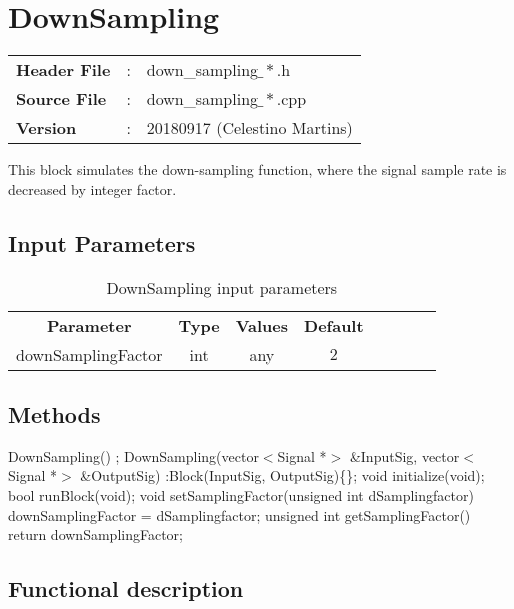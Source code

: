 \clearpage

\section{DownSampling}

\begin{tcolorbox}	
	\begin{tabular}{p{2.75cm} p{0.2cm} p{10.5cm}} 	
		\textbf{Header File}   &:& down\_sampling$\_*$.h \\
		\textbf{Source File}   &:& down\_sampling$\_*$.cpp \\
        \textbf{Version}       &:& 20180917 (Celestino Martins) \\
	\end{tabular}
\end{tcolorbox}

This block simulates the down-sampling function, where the signal sample rate is decreased by integer factor.

\subsection*{Input Parameters}

\begin{table}[h]
	\centering
	\begin{tabular}{|c|c|c|c|cccc}
		\cline{1-4}
		\textbf{Parameter} & \textbf{Type} & \textbf{Values} &   \textbf{Default}& \\ \cline{1-4}
		downSamplingFactor & int & any & $2$ \\ \cline{1-4}	
	\end{tabular}
	\caption{DownSampling input parameters}
	\label{table:down_sampling}
\end{table}


\subsection*{Methods}

DownSampling() {};
\bigbreak
DownSampling(vector$<$Signal *$>$ \&InputSig, vector$<$Signal *$>$ \&OutputSig) :Block(InputSig, OutputSig)\{\};
\bigbreak
void initialize(void);
\bigbreak
bool runBlock(void);
\bigbreak
void setSamplingFactor(unsigned int dSamplingfactor) { downSamplingFactor = dSamplingfactor; }
\bigbreak
unsigned int getSamplingFactor() { return downSamplingFactor; }

\subsection*{Functional description}

